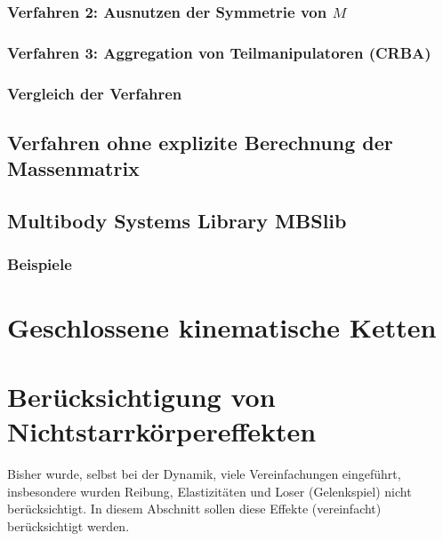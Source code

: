 			\subsubsection{Verfahren 2: Ausnutzen der Symmetrie von \(M\)} %

			\subsubsection{Verfahren 3: Aggregation von Teilmanipulatoren (CRBA)} %

			\subsubsection{Vergleich der Verfahren} %

		\subsection{Verfahren ohne explizite Berechnung der Massenmatrix} %

		\subsection{Multibody Systems Library MBSlib} %

			\subsubsection{Beispiele} %

	\section{Geschlossene kinematische Ketten} %

	\section{Berücksichtigung von Nichtstarrkörpereffekten}
		Bisher wurde, selbst bei der Dynamik, viele Vereinfachungen eingeführt, insbesondere wurden Reibung, Elastizitäten und Loser (Gelenkspiel) nicht berücksichtigt. In diesem Abschnitt sollen diese Effekte (vereinfacht) berücksichtigt werden.

